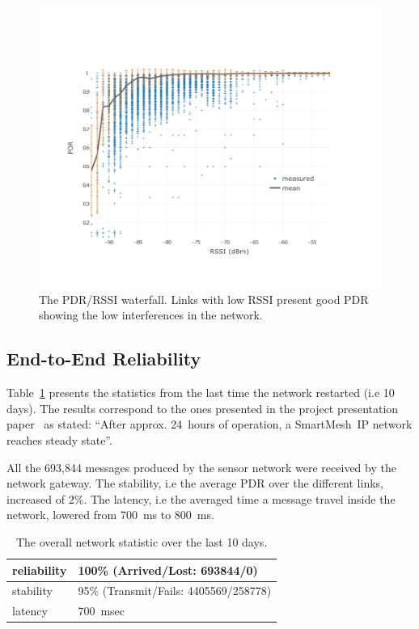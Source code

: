 \documentclass{sig-alternate}
\newcommand{\smip}                     {SmartMesh~IP\xspace}
\begin{document}
\begin{figure}
    \centering
    \includegraphics[width=\columnwidth]{waterfall}
    \caption{
        The PDR/RSSI waterfall.
        Links with low RSSI present good PDR showing the low interferences in the network.
    }
    \label{fig:waterfall}
\end{figure}

\subsection{End-to-End Reliability}
\label{sec:net_reliability}


Table~\ref{tab:net_stats} presents the statistics from the last time the network restarted (i.e 10 days).
The results correspond to the ones presented in the project presentation paper~\cite{watteyne16peach} as stated:
``After approx. 24~hours of operation, a \smip network reaches steady state''.

All the 693,844 messages produced by the sensor network were received by the network gateway.
The stability, i.e the average PDR over the different links, increased of 2\%.
The latency, i.e the averaged time a message travel inside the network, lowered from 700~ms to 800~ms.

\begin{table}
    \begin{tabular}{|l|l|}
        \hline
        reliability & 100\% (Arrived/Lost:   693844/0)\\ \hline
        stability   & 95\% (Transmit/Fails: 4405569/258778)\\ \hline
        latency     & 700~msec\\
        \hline
    \end{tabular}
    \caption{The overall network statistic over the last 10 days.}
    \label{tab:net_stats}
\end{table}
\end{document}
